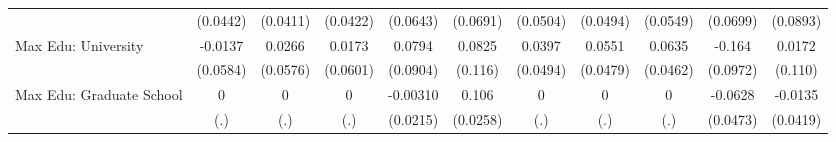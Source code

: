 {\begin{tabular}{l*{10}{c}}
            &    (0.0442)         &    (0.0411)         &    (0.0422)         &    (0.0643)         &    (0.0691)         &    (0.0504)         &    (0.0494)         &    (0.0549)         &    (0.0699)         &    (0.0893)         \\
\addlinespace
Max Edu: University&     -0.0137         &      0.0266         &      0.0173         &      0.0794         &      0.0825         &      0.0397         &      0.0551         &      0.0635         &      -0.164         &      0.0172         \\
            &    (0.0584)         &    (0.0576)         &    (0.0601)         &    (0.0904)         &     (0.116)         &    (0.0494)         &    (0.0479)         &    (0.0462)         &    (0.0972)         &     (0.110)         \\
\addlinespace
Max Edu: Graduate School&           0         &           0         &           0         &    -0.00310         &       0.106\sym{***}&           0         &           0         &           0         &     -0.0628         &     -0.0135         \\
            &         (.)         &         (.)         &         (.)         &    (0.0215)         &    (0.0258)         &         (.)         &         (.)         &         (.)         &    (0.0473)         &    (0.0419)         \\
\bottomrule
\end{tabular}
}
